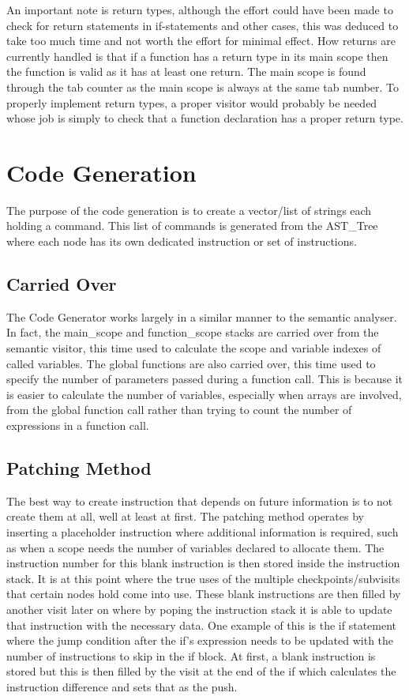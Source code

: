 \documentclass[12pt, a4paper]{report}
\begin{document}
An important note is return types, although the effort could have been made to check for return statements in if-statements and other cases, this was deduced to take too much time and not worth the effort for minimal effect. How returns are currently handled is that if a function has a return type in its main scope then the function is valid as it has at least one return. The main scope is found through the tab counter as the main scope is always at the same tab number. To properly implement return types, a proper visitor would probably be needed whose job is simply to check that a function declaration has a proper return type.


\chapter{Code Generation}
The purpose of the code generation is to create a vector/list of strings each holding a command. This list of commands is generated from the AST\_Tree where each node has its own dedicated instruction or set of instructions.

\section{Carried Over}
The Code Generator works largely in a similar manner to the semantic analyser. In fact, the main\_scope and function\_scope stacks are carried over from the semantic visitor, this time used to calculate the scope and variable indexes of called variables. The global functions are also carried over, this time used to specify the number of parameters passed during a function call. This is because it is easier to calculate the number of variables, especially when arrays are involved, from the global function call rather than trying to count the number of expressions in a function call.

\section{Patching Method}
The best way to create instruction that depends on future information is to not create them at all, well at least at first. The patching method operates by inserting a placeholder instruction where additional information is required, such as when a scope needs the number of variables declared to allocate them. The instruction number for this blank instruction is then stored inside the instruction stack. It is at this point where the true uses of the multiple checkpoints/subvisits that certain nodes hold come into use. These blank instructions are then filled by another visit later on where by poping the instruction stack it is able to update that instruction with the necessary data. One example of this is the if statement where the jump condition after the if's expression needs to be updated with the number of instructions to skip in the if block. At first, a blank instruction is stored but this is then filled by the visit at the end of the if which calculates the instruction difference and sets that as the push.
\end{document}
